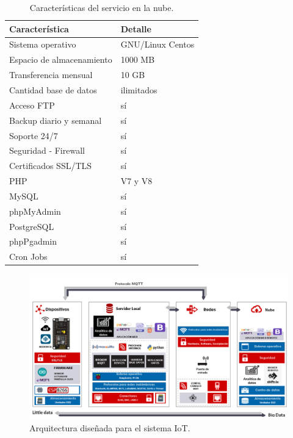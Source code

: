 \begin{table}[h]
	\centering
	\caption[Características del servicio en la nube]{Características del servicio en la nube.}
	\begin{tabular}{p{7cm} p{5cm} }    
		\toprule
		\textbf{Característica} 	 & \textbf{Detalle}  \\
		\midrule
		Sistema operativo  & GNU/Linux Centos\\		
		Espacio de almacenamiento & 1000 MB \\
		Transferencia mensual  & 10 GB\\				
		Cantidad base de datos 	  & ilimitados\\
		Acceso FTP 	  & sí\\
		Backup diario y semanal 	  & sí\\
		Soporte 24/7 	  & sí\\
		Seguridad - Firewall	  & sí\\
		Certificados SSL/TLS	  & sí\\
		PHP	  & V7 y V8\\
		MySQL	  & sí\\
		phpMyAdmin	  & sí\\
		PostgreSQL	  & sí\\
		phpPgadmin	  & sí\\
		Cron Jobs	  & sí\\
		\bottomrule
		\hline
	\end{tabular}
	\label{tab:serverweb}
\end{table}

\vspace{0.5cm}
\begin{landscape} %
\begin{figure}[htpb]
\centering 
\includegraphics[width=1.65\textwidth]{./Figures/arquitectura-listo.png}
\caption{Arquitectura diseñada para el sistema IoT.}
\label{fig:arquitectura}
\end{figure}
\end{landscape} %

